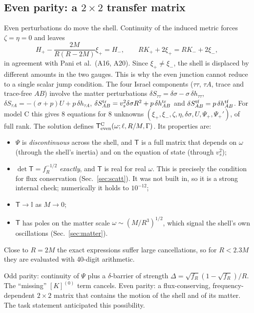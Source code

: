 \documentclass[11pt,a4paper]{article}
\numberwithin{equation}{section}
\newcommand{\sq}{\sqrt{f_R}}
\begin{document}
\subsection{Even parity: a $2\times2$ transfer matrix}\label{sec:even}
Even perturbations do move the shell. Continuity of the induced metric forces $\zeta=\eta=0$ and leaves
\begin{equation}
H_+-\frac{2M}{R(R-2M)}\xi_+=H_-,\qquad RK_++2\xi_+=RK_-+2\xi_-,
\end{equation}
in agreement with Pani et al.\ (A16, A20). Since $\xi_+\ne\xi_-$, the shell is displaced by different amounts in the two
gauges. This is why the even junction cannot reduce to a single scalar jump condition. The four Israel components
($\tau\tau$, $\tau A$, trace and trace-free $AB$) involve the matter perturbations
$\delta S_{\tau\tau}=\delta\sigma-\sigma\,\delta h_{\tau\tau}$, $\delta S_{\tau A}=-(\sigma+p)U+p\,\delta h_{\tau A}$,
$\delta S^{\rm tr}_{AB}=v_s^2\delta\sigma R^2+p\,\delta h^{\rm tr}_{AB}$ and $\delta S^{\rm tf}_{AB}=p\,\delta h^{\rm tf}_{AB}$.
For model C this gives 8 equations for 8 unknowns $(\xi_+,\xi_-,\zeta,\eta,\delta\sigma,U,\Psi_+,\Psi_+')$, of full rank.
The solution defines $\mathsf T^{\rm C}_{\rm even}(\omega;\ell,R/M,\Gamma)$. Its properties are:
\begin{itemize}
\item $\Psi$ is \emph{discontinuous} across the shell, and $\mathsf T$ is a full matrix that depends on $\omega$ (through
the shell's inertia) and on the equation of state (through $v_s^2$);
\item $\det\mathsf T=f_R^{-1/2}$ \emph{exactly}, and $\mathsf T$ is real for real $\omega$. This is precisely the condition
for flux conservation (Sec.~\ref{sec:scatt}). It was not built in, so it is a strong internal check; numerically it
holds to $10^{-12}$;
\item $\mathsf T\to\mathbb I$ as $M\to0$;
\item $\mathsf T$ has poles on the matter scale $\omega\sim(M/R^3)^{1/2}$, which signal the shell's own oscillations
(Sec.~\ref{sec:matter}).
\end{itemize}
Close to $R=2M$ the exact expressions suffer large cancellations, so for $R<2.3M$ they are evaluated with 40-digit
arithmetic.

\begin{learned}
Odd parity: continuity of $\Psi$ plus a $\delta$-barrier of strength $\Delta=\sq(1-\sq)/R$. The ``missing'' $[K]^{(0)}$
term cancels. Even parity: a flux-conserving, frequency-dependent $2\times2$ matrix that contains the motion of the shell
and of its matter. The task statement anticipated this possibility.
\end{learned}
\end{document}
